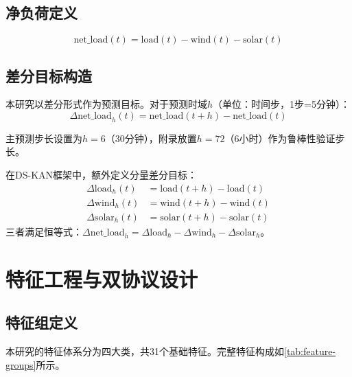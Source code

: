 \documentclass[12pt,a4paper,oneside]{ctexbook}
\begin{document}
\subsection{净负荷定义}

\begin{equation}
\text{net\_load}(t) = \text{load}(t) - \text{wind}(t) - \text{solar}(t)
\end{equation}

\subsection{差分目标构造}

本研究以差分形式作为预测目标。对于预测时域$h$（单位：时间步，1步=5分钟）：
\begin{equation}
\Delta\text{net\_load}_{h}(t) = \text{net\_load}(t+h) - \text{net\_load}(t)
\end{equation}

主预测步长设置为$h=6$（30分钟），附录放置$h=72$（6小时）作为鲁棒性验证步长。

在DS-KAN框架中，额外定义分量差分目标：
\begin{align}
\Delta\text{load}_{h}(t) &= \text{load}(t+h) - \text{load}(t) \\
\Delta\text{wind}_{h}(t) &= \text{wind}(t+h) - \text{wind}(t) \\
\Delta\text{solar}_{h}(t) &= \text{solar}(t+h) - \text{solar}(t)
\end{align}
三者满足恒等式：$\Delta\text{net\_load}_{h} = \Delta\text{load}_{h} - \Delta\text{wind}_{h} - \Delta\text{solar}_{h}$。

\section{特征工程与双协议设计}

\subsection{特征组定义}

本研究的特征体系分为四大类，共31个基础特征。完整特征构成如\cref{tab:feature-groups}所示。
\end{document}
